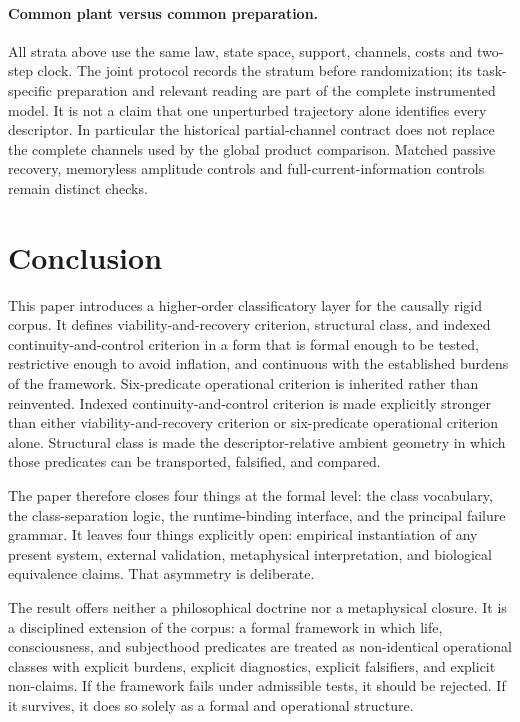 \documentclass[11pt,a4paper]{article}
\theoremstyle{definition}
\begin{document}
\paragraph{Common plant versus common preparation.}
All strata above use the same law, state space, support, channels, costs and
two-step clock. The joint protocol records the stratum before randomization;
its task-specific preparation and relevant reading are part of the complete
instrumented model. It is not a claim that one unperturbed trajectory alone
identifies every descriptor. In particular the historical partial-channel
contract does not replace the complete channels used by the global product
comparison. Matched passive recovery, memoryless amplitude controls and
full-current-information controls remain distinct checks.

\section{Conclusion}
This paper introduces a higher-order classificatory layer for the causally rigid corpus. It defines viability-and-recovery criterion, structural class, and indexed continuity-and-control criterion in a form that is formal enough to be tested, restrictive enough to avoid inflation, and continuous with the established burdens of the framework. Six-predicate operational criterion is inherited rather than reinvented. Indexed continuity-and-control criterion is made explicitly stronger than either viability-and-recovery criterion or six-predicate operational criterion alone. Structural class is made the descriptor-relative ambient geometry in which those predicates can be transported, falsified, and compared.

The paper therefore closes four things at the formal level: the class vocabulary, the class-separation logic, the runtime-binding interface, and the principal failure grammar. It leaves four things explicitly open: empirical instantiation of any present system, external validation, metaphysical interpretation, and biological equivalence claims. That asymmetry is deliberate.

The result offers neither a philosophical doctrine nor a metaphysical closure. It is a disciplined extension of the corpus: a formal framework in which life, consciousness, and subjecthood predicates are treated as non-identical operational classes with explicit burdens, explicit diagnostics, explicit falsifiers, and explicit non-claims. If the framework fails under admissible tests, it should be rejected. If it survives, it does so solely as a formal and operational structure.
\end{document}
